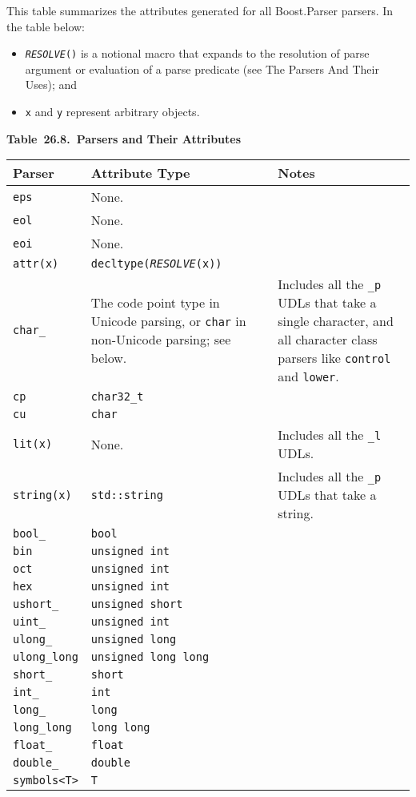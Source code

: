 This table summarizes the attributes generated for all Boost.Parser parsers. In the table below:

\begin{itemize}
\item
  \emph{\texttt{RESOLVE}}\texttt{()} is a notional macro that expands to the resolution of parse argument or evaluation of a parse predicate (see The Parsers And Their Uses); and
\item
  \texttt{x} and \texttt{y} represent arbitrary objects.
\end{itemize}

\textbf{Table~26.8.~Parsers and Their Attributes}

\begin{longtable}[]{@{}lll@{}}
\toprule\noalign{}
Parser & Attribute Type & Notes \\
\midrule\noalign{}
\endhead
\bottomrule\noalign{}
\endlastfoot
\texttt{eps} & None. & \\
\texttt{eol} & None. & \\
\texttt{eoi} & None. & \\
\texttt{attr(x)} & \texttt{decltype(}\emph{\texttt{RESOLVE}}\texttt{(x))} & \\
\texttt{char\_} & The code point type in Unicode parsing, or \texttt{char} in non-Unicode parsing; see below. & Includes all the \texttt{\_p} UDLs that take a single character, and all character class parsers like \texttt{control} and \texttt{lower}. \\
\texttt{cp} & \texttt{char32\_t} & \\
\texttt{cu} & \texttt{char} & \\
\texttt{lit(x)} & None. & Includes all the \texttt{\_l} UDLs. \\
\texttt{string(x)} & \texttt{std::string} & Includes all the \texttt{\_p} UDLs that take a string. \\
\texttt{bool\_} & \texttt{bool} & \\
\texttt{bin} & \texttt{unsigned int} & \\
\texttt{oct} & \texttt{unsigned int} & \\
\texttt{hex} & \texttt{unsigned int} & \\
\texttt{ushort\_} & \texttt{unsigned short} & \\
\texttt{uint\_} & \texttt{unsigned int} & \\
\texttt{ulong\_} & \texttt{unsigned long} & \\
\texttt{ulong\_long} & \texttt{unsigned long long} & \\
\texttt{short\_} & \texttt{short} & \\
\texttt{int\_} & \texttt{int} & \\
\texttt{long\_} & \texttt{long} & \\
\texttt{long\_long} & \texttt{long long} & \\
\texttt{float\_} & \texttt{float} & \\
\texttt{double\_} & \texttt{double} & \\
\texttt{symbols<T>} & \texttt{T} & \\
\end{longtable}

